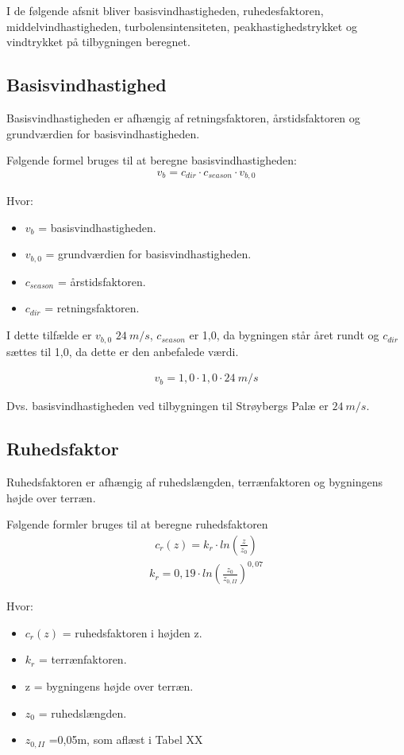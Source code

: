 I de følgende afsnit bliver basisvindhastigheden, ruhedesfaktoren, middelvindhastigheden, turbolensintensiteten, peakhastighedstrykket og vindtrykket på tilbygningen beregnet.


\subsection{Basisvindhastighed}
Basisvindhastigheden er afhængig af retningsfaktoren, årstidsfaktoren og grundværdien for basisvindhastigheden.

Følgende formel bruges til at beregne basisvindhastigheden:
\begin{align*}
v_{b} = c_{dir} \cdot c_{season} \cdot v_{b,0}
\end{align*}

Hvor:
\begin{itemize}
\item $v_{b}$ = basisvindhastigheden.
\item $v_{b,0}$ = grundværdien for basisvindhastigheden.
\item $ c_{season} $ = årstidsfaktoren.
\item $ c_{dir} $ = retningsfaktoren.
\end{itemize}
I dette tilfælde er $ v_{b,0} $ $ \SI{24}{m/s} $, $ c_{season} $ er 1,0, da bygningen står året rundt og $ c_{dir} $ sættes til 1,0, da dette er den anbefalede værdi.

\begin{align*}
v_{b} = 1,0 \cdot 1,0 \cdot \SI{24}{m/s}
\end{align*}

Dvs. basisvindhastigheden ved tilbygningen til Strøybergs Palæ er $ \SI{24}{m/s} $.

\subsection{Ruhedsfaktor}
Ruhedsfaktoren er afhængig af ruhedslængden, terrænfaktoren og bygningens højde over terræn.

Følgende formler bruges til at beregne ruhedsfaktoren
\begin{align*}
c_{r}(z) = k_{r} \cdot ln\left(\frac{z}{z_{0}}\right)
\end{align*}
\begin{align*}
k_{r} = 0,19 \cdot ln\left(\frac{z_{0}}{z_{0,II}}\right)^{0,07}
\end{align*}

Hvor:
\begin{itemize}
\item $ c_{r}(z) $ = ruhedsfaktoren i højden z.
\item $ k_{r} $ = terrænfaktoren.
\item z = bygningens højde over terræn.
\item $ z_{0} $ = ruhedslængden.
\item $ z_{0,II} $ =0,05m, som aflæst i Tabel XX
\end{itemize}

